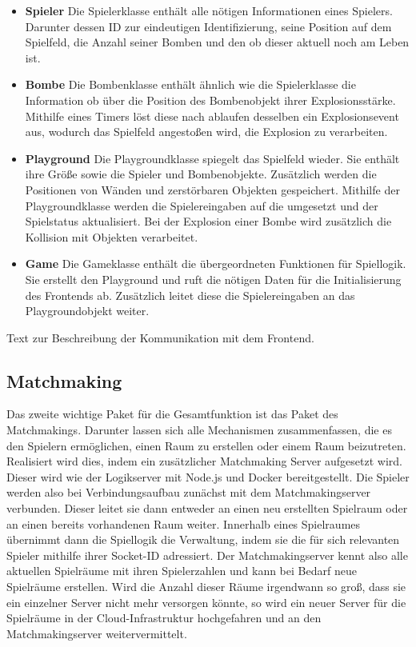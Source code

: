 \documentclass[conference]{IEEEtran}
\begin{document}
\begin{itemize}
    \item \textbf{Spieler}
    Die Spielerklasse enthält alle nötigen Informationen eines 	Spielers. Darunter dessen ID zur eindeutigen 					Identifizierung, seine Position auf dem Spielfeld, die 			Anzahl seiner Bomben und den ob dieser aktuell noch am 			Leben ist.
    \smallskip
    \item \textbf{Bombe} 
    Die Bombenklasse enthält ähnlich wie die Spielerklasse die 	Information ob über die Position des Bombenobjekt ihrer 		Explosionsstärke. Mithilfe eines Timers löst diese nach 		ablaufen desselben ein Explosionsevent aus, wodurch das 		Spielfeld angestoßen wird, die Explosion zu verarbeiten.
    \smallskip
    \item \textbf{Playground}
    Die Playgroundklasse spiegelt das Spielfeld wieder. Sie 
    enthält ihre Größe sowie die Spieler und Bombenobjekte.
    Zusätzlich werden die Positionen von Wänden und 
    zerstörbaren Objekten gespeichert. Mithilfe der 
    Playgroundklasse werden die Spielereingaben auf die
   	umgesetzt und der Spielstatus aktualisiert. Bei der
   	Explosion einer Bombe wird zusätzlich die Kollision 
   	mit Objekten verarbeitet.
    \smallskip
    \item \textbf{Game}
    Die Gameklasse enthält die übergeordneten Funktionen für
    Spiellogik. Sie erstellt den Playground und ruft die 
    nötigen Daten für die Initialisierung des Frontends ab.
    Zusätzlich leitet diese die Spielereingaben an das
    Playgroundobjekt weiter.

\end{itemize}

Text zur Beschreibung der Kommunikation mit dem Frontend.

\subsection{Matchmaking}
Das zweite wichtige Paket für die Gesamtfunktion ist das Paket des Matchmakings. Darunter lassen sich alle Mechanismen zusammenfassen, die es den Spielern ermöglichen, einen Raum zu erstellen oder einem Raum beizutreten. Realisiert wird dies, indem ein zusätzlicher Matchmaking Server aufgesetzt wird. Dieser wird wie der Logikserver mit Node.js und Docker bereitgestellt. Die Spieler werden also bei Verbindungsaufbau zunächst mit dem Matchmakingserver verbunden. Dieser leitet sie dann entweder an einen neu erstellten Spielraum oder an einen bereits vorhandenen Raum weiter. Innerhalb eines Spielraumes übernimmt dann die Spiellogik die Verwaltung, indem sie die für sich relevanten Spieler mithilfe ihrer Socket-ID adressiert. Der Matchmakingserver kennt also alle aktuellen Spielräume mit ihren Spielerzahlen und kann bei Bedarf neue Spielräume erstellen. Wird die Anzahl dieser Räume irgendwann so groß, dass sie ein einzelner Server nicht mehr versorgen könnte, so wird ein neuer Server für die Spielräume in der Cloud-Infrastruktur hochgefahren und an den Matchmakingserver weitervermittelt.
\end{document}
